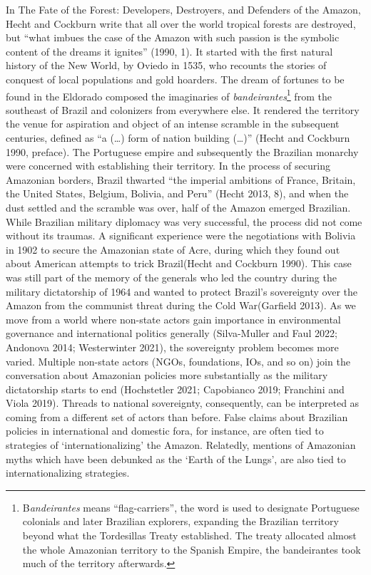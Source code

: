 \documentclass[
]{article}
\begin{document}
In The Fate of the Forest: Developers, Destroyers, and Defenders of the
Amazon, Hecht and Cockburn write that all over the world tropical
forests are destroyed, but ``what imbues the case of the Amazon with
such passion is the symbolic content of the dreams it ignites'' (1990,
1). It started with the first natural history of the New World, by
Oviedo in 1535, who recounts the stories of conquest of local
populations and gold hoarders. The dream of fortunes to be found in the
Eldorado composed the imaginaries of \emph{bandeirantes}\footnote{B\emph{andeirantes}
  means ``flag-carriers'', the word is used to designate Portuguese
  colonials and later Brazilian explorers, expanding the Brazilian
  territory beyond what the Tordesillas Treaty established. The treaty
  allocated almost the whole Amazonian territory to the Spanish Empire,
  the bandeirantes took much of the territory afterwards.} from the
southeast of Brazil and colonizers from everywhere else. It rendered the
territory the venue for aspiration and object of an intense scramble in
the subsequent centuries, defined as ``a (\ldots) form of nation
building (\ldots)'' (Hecht and Cockburn 1990, preface). The Portuguese
empire and subsequently the Brazilian monarchy were concerned with
establishing their territory. In the process of securing Amazonian
borders, Brazil thwarted ``the imperial ambitions of France, Britain,
the United States, Belgium, Bolivia, and Peru'' (Hecht 2013, 8), and
when the dust settled and the scramble was over, half of the Amazon
emerged Brazilian. While Brazilian military diplomacy was very
successful, the process did not come without its traumas. A significant
experience were the negotiations with Bolivia in 1902 to secure the
Amazonian state of Acre, during which they found out about American
attempts to trick Brazil(Hecht and Cockburn 1990). This case was still
part of the memory of the generals who led the country during the
military dictatorship of 1964 and wanted to protect Brazil's sovereignty
over the Amazon from the communist threat during the Cold War(Garfield
2013). As we move from a world where non-state actors gain importance in
environmental governance and international politics generally
(Silva-Muller and Faul 2022; Andonova 2014; Westerwinter 2021), the
sovereignty problem becomes more varied. Multiple non-state actors
(NGOs, foundations, IOs, and so on) join the conversation about
Amazonian policies more substantially as the military dictatorship
starts to end (Hochstetler 2021; Capobianco 2019; Franchini and Viola
2019). Threads to national sovereignty, consequently, can be interpreted
as coming from a different set of actors than before. False claims about
Brazilian policies in international and domestic fora, for instance, are
often tied to strategies of `internationalizing' the Amazon. Relatedly,
mentions of Amazonian myths which have been debunked as the `Earth of
the Lungs', are also tied to internationalizing strategies.
\end{document}
